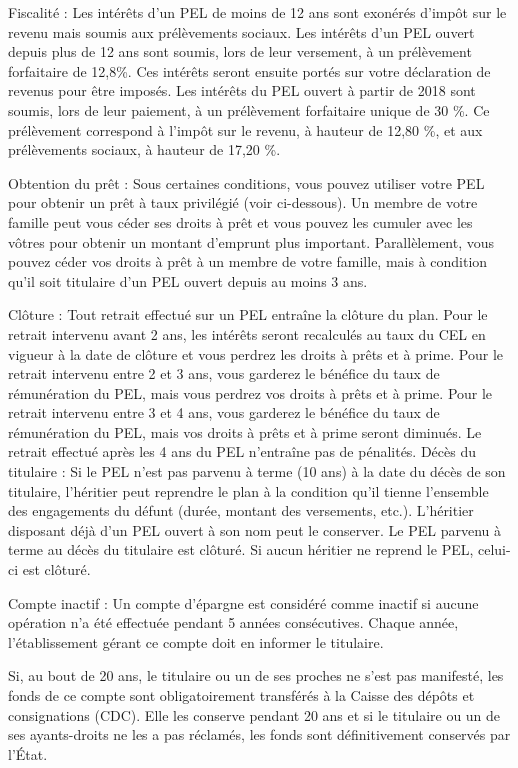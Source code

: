 \documentclass[12pt, a4paper]{book}
\begin{document}
{Fiscalité : Les intérêts d'un PEL de moins de 12 ans sont exonérés d'impôt sur le revenu mais soumis aux prélèvements sociaux. Les intérêts d'un PEL ouvert depuis plus de 12 ans sont soumis, lors de leur versement, à un prélèvement forfaitaire de 12,8\%. Ces intérêts seront ensuite portés sur votre déclaration de revenus pour être imposés.
Les intérêts du PEL ouvert à partir de 2018 sont soumis, lors de leur paiement, à un prélèvement forfaitaire unique de 30 \%. Ce prélèvement correspond à l'impôt sur le revenu, à hauteur de 12,80 \%, et aux prélèvements sociaux, à hauteur de 17,20 \%.

Obtention du prêt : Sous certaines conditions, vous pouvez utiliser votre PEL pour obtenir un prêt à taux privilégié (voir ci-dessous). Un membre de votre famille peut vous céder ses droits à prêt et vous pouvez les cumuler avec les vôtres pour obtenir un montant d'emprunt plus important. Parallèlement, vous pouvez céder vos droits à prêt à un membre de votre famille, mais à condition qu'il soit titulaire d'un PEL ouvert depuis au moins 3 ans.

Clôture : Tout retrait effectué sur un PEL entraîne la clôture du plan. Pour le retrait intervenu avant 2 ans, les intérêts seront recalculés au taux du CEL en vigueur à la date de clôture et vous perdrez les droits à prêts et à prime. Pour le retrait intervenu entre 2 et 3 ans, vous garderez le bénéfice du taux de rémunération du PEL, mais vous perdrez vos droits à prêts et à prime. Pour le retrait intervenu entre 3 et 4 ans, vous garderez le bénéfice du taux de rémunération du PEL, mais vos droits à prêts et à prime seront diminués. Le retrait effectué après les 4 ans du PEL n'entraîne pas de pénalités. 
Décès du titulaire :  Si le PEL n'est pas parvenu à terme (10 ans) à la date du décès de son titulaire, l'héritier peut reprendre le plan à la condition qu'il tienne l'ensemble des engagements du défunt (durée, montant des versements, etc.). L'héritier disposant déjà d'un PEL ouvert à son nom peut le conserver. Le PEL parvenu à terme au décès du titulaire est clôturé. Si aucun héritier ne reprend le PEL, celui-ci est clôturé.

Compte inactif : Un compte d'épargne est considéré comme inactif si aucune opération n'a été effectuée pendant 5 années consécutives. Chaque année, l'établissement gérant ce compte doit en informer le titulaire.

Si, au bout de 20 ans, le titulaire ou un de ses proches ne s'est pas manifesté, les fonds de ce compte sont obligatoirement transférés à la Caisse des dépôts et consignations (CDC). Elle les conserve pendant 20 ans et si le titulaire ou un de ses ayants-droits ne les a pas réclamés, les fonds sont définitivement conservés par l'État.


}
\end{document}
